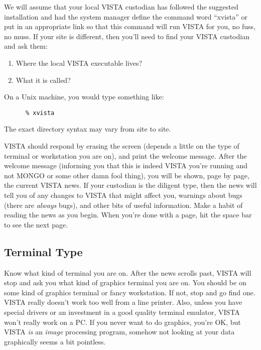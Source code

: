 We will assume that your local VISTA custodian has followed the suggested
installation and had the system manager define the command word ``xvista'' or
put in an appropriate link so that this command will
run VISTA for you, no fuss, no muss.  If your site is different, then you'll
need to find your VISTA custodian and ask them:

\begin{enumerate}
      \item Where the local VISTA executable lives?
      \item What it is called?
\end{enumerate}

%
%
On a Unix machine, you would type something like:

\begin{verbatim}
      % xvista
\end{verbatim}

\noindent
The exact directory syntax may vary from site to site.

VISTA should respond by erasing the screen (depends a little on the type of
terminal or workstation you are on), and print the welcome message.  After the
welcome message (informing you that this is indeed VISTA you're running and
not MONGO or some other damn fool thing), you will be shown, page by page, the
current VISTA news.  If your custodian is the diligent type, then the news
will tell you of any changes to VISTA that might affect you, warnings about
bugs (there are {\it always} bugs), and other bits of useful information. Make
a habit of reading the news as you begin.  When you're done with a page, hit
the space bar to see the next page.

\subsection{Terminal Type}
\label{sec:tutterm}

Know what kind of terminal you are on.  After the news scrolls past, VISTA
will stop and ask you what kind of graphics terminal you are on.  You should
be on some kind of graphics terminal or fancy workstation.  If not, stop and
go find one.  VISTA really doesn't work too well from a line printer.  Also,
unless you have special drivers or an investment in a good quality terminal
emulator, VISTA won't really work on a PC.  If you never want to do graphics,
you're OK, but VISTA {\it is} an {\it image} processing program, somehow not
looking at your data graphically seems a bit pointless.

